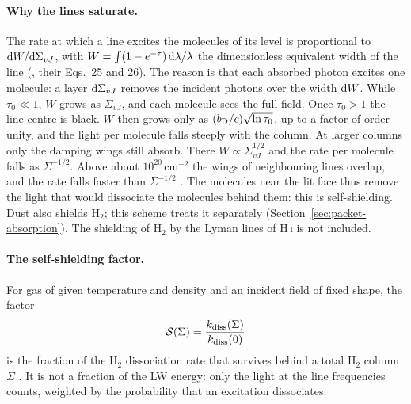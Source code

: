 \paragraph{Why the lines saturate.} The rate at which a line excites the
molecules of its level is proportional to ${\rm d}W/{\rm d}\Sigma_{vJ}$, with
$W=\int(1-e^{-\tau})\,{\rm d}\lambda/\lambda$ the dimensionless equivalent width
of the line (\citealt{DraineBertoldi1996}, their Eqs.~25 and 26). The reason is
that each absorbed photon excites one molecule: a layer
${\rm d}\Sigma_{vJ}$ removes the incident photons over the width ${\rm d}W$.
While $\tau_0\ll1$, $W$ grows as
$\Sigma_{vJ}$, and each molecule sees the full field. Once $\tau_0>1$ the line
centre is black. $W$ then grows only as $(b_{\rm D}/c)\sqrt{\ln\tau_0}$, up to a
factor of order unity, and the light per molecule falls steeply with the
column. At larger columns only the
damping wings still absorb. There $W\propto\Sigma_{vJ}^{1/2}$ and the rate per
molecule falls as $\Sigma^{-1/2}$. Above about $10^{20}$\,cm$^{-2}$ the wings
of neighbouring lines overlap, and the rate falls faster than
$\Sigma^{-1/2}$ \citep{DraineBertoldi1996}. The molecules near the lit face thus
remove the light that would dissociate the molecules behind them: this is
self-shielding. Dust also shields H$_2$; this scheme treats it separately
(Section~\ref{sec:packet-absorption}). The shielding of H$_2$ by the Lyman
lines of H\,\textsc{i} is not included.

\paragraph{The self-shielding factor.} For gas of given temperature and density
and an incident field of fixed shape, the factor
\begin{equation}
  \mathcal S(\Sigma)=\frac{k_{\rm diss}(\Sigma)}{k_{\rm diss}(0)}
  \label{eq:h2-factor-def}
\end{equation}
is the fraction of the H$_2$ dissociation rate that survives behind a total
H$_2$ column $\Sigma$ \citep{WolcottGreenHaiman2019}. It is not a fraction of
the LW energy: only the light at the line frequencies counts, weighted by the
probability that an excitation dissociates.

